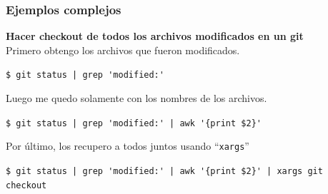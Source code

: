 \documentclass{beamer}
\begin{document}
\begin{frame}[fragile,t]
    \frametitle{\small Ejemplos complejos}
    \textbf{Hacer checkout de todos los archivos modificados en un git}\\
    \vspace{0.5cm}
    \small \pause
    Primero obtengo los archivos que fueron modificados.
    \vspace{-0.3cm} \scriptsize
    \begin{block}{\vspace*{-3ex}}
    \texttt{\$}\verb; git status | grep 'modified:';
    \vspace*{0.5ex}
    \end{block}
    \vspace{0.4cm}
    \small \pause
    Luego me quedo solamente con los nombres de los archivos.
    \vspace{-0.3cm} \scriptsize
    \begin{block}{\vspace*{-3ex}}
    \texttt{\$}\verb; git status | grep 'modified:' | awk '{print $2}';
    \vspace*{0.5ex}
    \end{block}
    \vspace{0.4cm}
    \small \pause
    Por último, los recupero a todos juntos usando ``\verb|xargs|''
    \vspace{-0.3cm} \scriptsize
    \begin{block}{\vspace*{-3ex}}
    \texttt{\$}\verb; git status | grep 'modified:' | awk '{print $2}' | xargs git checkout;
    \vspace*{0.5ex}
    \end{block}
\end{frame}
\end{document}
